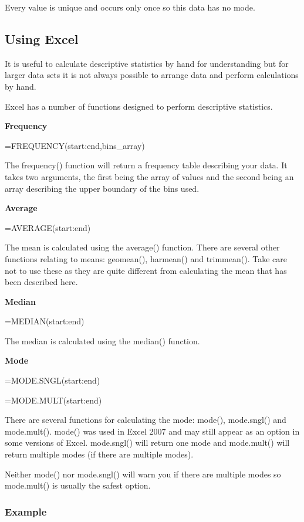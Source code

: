 \documentclass[
]{book}
\begin{document}
Every value is unique and occurs only once so this data has no mode.

\hypertarget{using-excel}{%
\subsection{Using Excel}\label{using-excel}}

It is useful to calculate descriptive statistics by hand for understanding but for larger data sets it is not always possible to arrange data and perform calculations by hand.

Excel has a number of functions designed to perform descriptive statistics.

\textbf{Frequency}

=FREQUENCY(start:end,bins\_array)

The frequency() function will return a frequency table describing your data. It takes two arguments, the first being the array of values and the second being an array describing the upper boundary of the bins used.

\textbf{Average}

=AVERAGE(start:end)

The mean is calculated using the average() function. There are several other functions relating to means: geomean(), harmean() and trimmean(). Take care not to use these as they are quite different from calculating the mean that has been described here.

\textbf{Median}

=MEDIAN(start:end)

The median is calculated using the median() function.

\textbf{Mode}

=MODE.SNGL(start:end)

=MODE.MULT(start:end)

There are several functions for calculating the mode: mode(), mode.sngl() and mode.mult().
mode() was used in Excel 2007 and may still appear as an option in some versions of Excel.
mode.sngl() will return one mode and mode.mult() will return multiple modes (if there are multiple modes).

Neither mode() nor mode.sngl() will warn you if there are multiple modes so mode.mult() is usually the safest option.

\hypertarget{example-6}{%
\subsubsection{Example}\label{example-6}}
\end{document}
